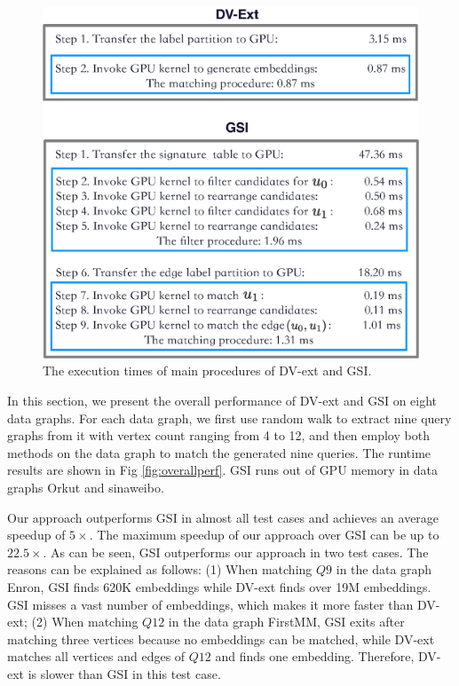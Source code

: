 \begin{figure}
\centering
\includegraphics[width=\columnwidth]{./figure/comparegsi.eps}
\caption{The execution times of main procedures of DV-ext and GSI.}	
\label{fig:compdvgsi}
\end{figure}
In this section, we present the overall performance of DV-ext and GSI on eight data graphs. For each data graph, we first use random walk to extract nine query graphs from it with vertex count ranging from 4 to 12, and then employ both methods on the data graph to match the generated nine queries. The runtime results are shown in Fig \ref{fig:overallperf}. GSI runs out of GPU memory in data graphs Orkut and sinaweibo.

Our approach outperforms GSI in almost all test cases and achieves an average speedup of $5\times$. The maximum speedup of our approach over GSI can be up to $22.5\times$. As can be seen, GSI outperforms our approach in two test cases. The reasons can be explained as follows: (1) When matching $Q9$ in the data graph Enron, GSI finds 620K embeddings while DV-ext finds over 19M embeddings. GSI misses a vast number of embeddings, which makes it more faster than DV-ext; (2) When matching $Q12$ in the data graph FirstMM, GSI exits after matching three vertices because no embeddings can be matched, while DV-ext matches all vertices and edges of $Q12$ and finds one embedding. Therefore, DV-ext is slower than GSI in this test case.

